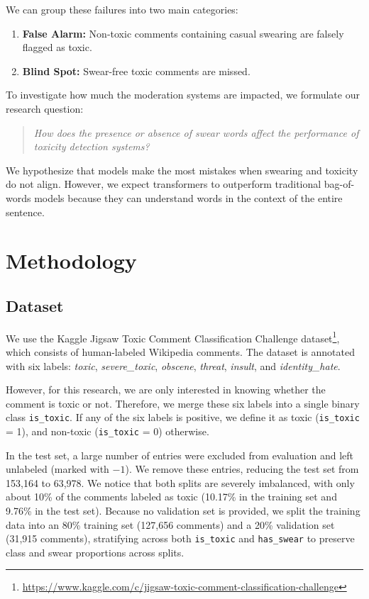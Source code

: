 \documentclass[11pt]{article}
\begin{document}
We can group these failures into two main categories:
\begin{enumerate}
  \item \textbf{False Alarm:} Non-toxic comments containing casual
    swearing are falsely flagged as toxic.
  \item \textbf{Blind Spot:} Swear-free toxic comments are missed.
\end{enumerate}

To investigate how much the moderation systems are impacted, we
formulate our research question:

\begin{quote}
  \noindent\textit{How does the presence or absence of swear words
  affect the performance of toxicity detection systems?}
\end{quote}

We hypothesize that models make the most mistakes when swearing and
toxicity do not align. However, we expect transformers to outperform
traditional bag-of-words models because they can understand words
in the context of the entire sentence.

\section{Methodology}

\subsection{Dataset}

We use the Kaggle Jigsaw Toxic Comment Classification Challenge
dataset\footnote{\url{https://www.kaggle.com/c/jigsaw-toxic-comment-classification-challenge}},
which consists of human-labeled Wikipedia comments. The
dataset is annotated with six labels: \textit{toxic},
\textit{severe\_toxic}, \textit{obscene}, \textit{threat},
\textit{insult}, and \textit{identity\_hate}.

However, for this research, we are only interested in knowing whether
the comment is toxic or not. Therefore, we merge these six labels
into a single binary class \texttt{is\_toxic}. If any of the six
labels is positive, we define it as toxic (\texttt{is\_toxic} = 1),
and non-toxic (\texttt{is\_toxic} = 0) otherwise.

In the test set, a large number of entries were excluded from
evaluation and left unlabeled (marked with $-1$). We remove these
entries, reducing the test set from 153,164 to 63,978. We notice that
both splits are severely imbalanced, with only about 10\% of the
comments labeled as toxic (10.17\% in the training set and 9.76\% in
the test set). Because no validation set is provided, we split the
training data into an 80\% training set (127,656 comments) and a 20\%
validation set (31,915 comments), stratifying across both
\texttt{is\_toxic} and \texttt{has\_swear} to preserve class and swear
proportions across splits.
\end{document}
